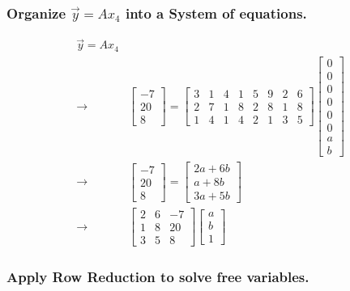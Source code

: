 \documentclass[11pt]{article}
\begin{document}
\subsubsection{Organize \(\vec y = A x_4\) into a System of equations.}
\label{sec:orgd835fc9}

\begin{equation}
\begin{split}
\vec y = A x_4 & \\
\to & \begin{bmatrix} -7\\ 20\\ 8 \end{bmatrix} = \begin{bmatrix} 3 & 1 & 4 & 1 & 5 & 9 & 2 & 6\\ 2 & 7 & 1 & 8 & 2 & 8 &
1 & 8\\ 1 & 4 & 1 & 4 & 2 & 1 & 3 & 5 \end{bmatrix} \begin{bmatrix}
0\\ 0\\ 0\\ 0\\ 0\\ 0\\ a\\ b
\end{bmatrix}\\
\to & \begin{bmatrix}
-7\\ 20\\ 8
\end{bmatrix} = \begin{bmatrix}
2a + 6b\\
a + 8b\\
3a + 5b
\end{bmatrix}\\
\to & \begin{bmatrix}
2 & 6 & -7\\
1 & 8 & 20\\
3 & 5 & 8
\end{bmatrix} \begin{bmatrix}
a\\ b\\ 1
\end{bmatrix}
\end{split}
\end{equation}

\subsubsection{Apply Row Reduction to solve free variables.}
\label{sec:org94902e4}
\end{document}
